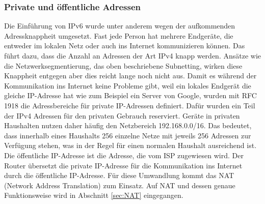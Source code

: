	\subsubsection{Private und öffentliche Adressen}
	\label{sec:priv_pub_adr}
	Die Einführung von IPv6 wurde unter anderem wegen der aufkommenden Adressknappheit
	umgesetzt. Fast jede Person hat mehrere Endgeräte, die entweder im lokalen Netz
	oder auch ins Internet kommunizieren können. Das führt dazu, dass die Anzahl
	an Adressen der Art IPv4 knapp werden. Ansätze wie die Netzwerksegmentierung,
	das oben beschriebene Subnetting, wirken diese Knappheit entgegen aber dies 
	reicht lange noch nicht aus. Damit es während der Kommunikation ins Internet keine
	Probleme gibt, weil ein lokales Endgerät die gleiche IP-Adresse hat wie zum
	Beispiel ein Server von Google, wurden mit RFC 1918 die Adressbereiche für 
	private IP-Adressen definiert. Dafür wurden ein Teil der IPv4 Adressen für den 
	privaten Gebrauch reserviert. Geräte in privaten Haushalten nutzen daher
	häufig den Netzbereich 192.168.0.0/16. Das bedeutet, dass innerhalb eines %
	Haushalts 256 einzelne Netze mit jeweils 256 Adressen zur Verfügung stehen, 
	was in der Regel für einen normalen Haushalt ausreichend ist.
	Die öffentliche IP-Adresse ist die Adresse, die vom ISP zugewiesen wird. Der
	Router übersetzt die private IP-Adresse für die Kommunikation ins Internet
	durch die öffentliche IP-Adresse. Für diese Umwandlung kommt das NAT (Network
	Address Translation) zum Einsatz. Auf NAT und dessen genaue Funktionsweise wird
	in Abschnitt \ref{sec:NAT} eingegangen.
	\cite{zisler2022, baun2025}

